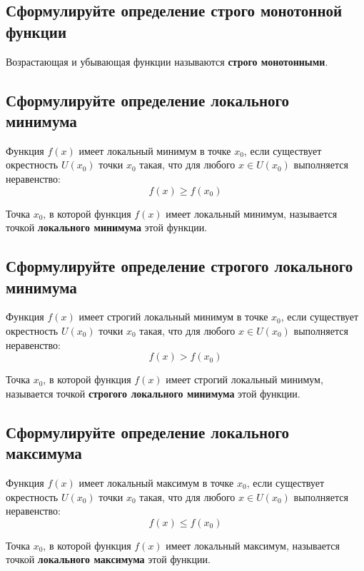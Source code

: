 \subsection{Сформулируйте определение строго монотонной функции}
\begin{definition}
    Возрастающая и убывающая функции называются \textbf{строго монотонными}.
\end{definition}

\subsection{Сформулируйте определение локального минимума}
\begin{theorem*}
    Функция $f(x)$ имеет локальный минимум в точке $x_0$, если существует окрестность $U(x_0)$ точки $x_0$ такая, что для любого $x \in U(x_0)$ выполняется неравенство: \[ f(x)\ge f(x_0) \]
\end{theorem*}
\begin{definition}
    Точка $x_0$, в которой функция $f(x)$ имеет локальный минимум, называется точкой \textbf{локального минимума} этой функции.
\end{definition}

\subsection{Сформулируйте определение строгого локального минимума}
\begin{theorem*}
    Функция $f(x)$ имеет строгий локальный минимум в точке $x_0$, если существует окрестность $U(x_0)$ точки $x_0$ такая, что для любого $x \in U(x_0)$ выполняется неравенство: \[ f(x) > f(x_0) \]
\end{theorem*}
\begin{definition}
    Точка $x_0$, в которой функция $f(x)$ имеет строгий локальный минимум, называется точкой \textbf{строгого локального минимума} этой функции.
\end{definition}
\newpage
\subsection{Сформулируйте определение локального максимума}
\begin{theorem*}
    Функция $f(x)$ имеет локальный максимум в точке $x_0$, если существует окрестность $U(x_0)$ точки $x_0$ такая, что для любого $x \in U(x_0)$ выполняется неравенство: \[ f(x) \le f(x_0) \]
\end{theorem*}
\begin{definition}
    Точка $x_0$, в которой функция $f(x)$ имеет локальный максимум, называется точкой \textbf{локального максимума} этой функции.   
\end{definition}

